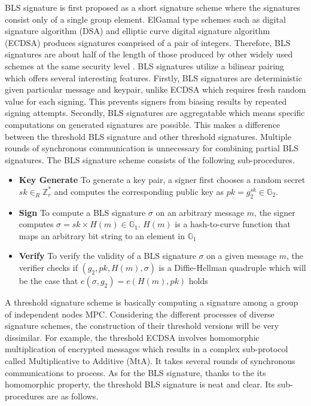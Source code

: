\documentclass[11pt]{article}
\begin{document}
BLS signature is first proposed as a short signature scheme where the signatures consist only of a single group element. ElGamal type schemes such as digital signature algorithm (DSA) and elliptic curve digital signature algorithm (ECDSA) produces signatures comprised of a pair of integers. Therefore, BLS signatures are about half of the length of those produced by other widely used schemes at the same security level \cite{menezes2009introduction}. BLS signatures utilize a bilinear pairing which offers several interesting features. Firstly, BLS signatures are deterministic given particular message and keypair, unlike ECDSA which requires fresh random value for each signing. This prevents signers from biasing results by repeated signing attempts. Secondly, BLS signatures are aggregatable which means specific computations on generated signatures are possible. This makes a difference between the threshold BLS signature and other threshold signatures. Multiple rounds of synchronous communication is unnecessary for combining partial BLS signatures. The BLS signature scheme consists of the following sub-procedures.
\begin{itemize}
    \item[] \textbf{Key Generate} To generate a key pair, a signer first chooses a random secret $sk \in_R \mathbb{Z}_r^*$ and computes the corresponding public key as $pk = g_2^{sk} \in \mathbb{G}_2$.
    \item[] \textbf{Sign} To compute a BLS signature $\sigma$ on an arbitrary message $m$, the signer computes $\sigma = sk \times H(m) \in \mathbb{G}_1$. $H(m)$ is a hash-to-curve function that maps an arbitrary bit string to an element in $\mathbb{G}_1$
    \item[] \textbf{Verify} To verify the validity of a BLS signature $\sigma$ on a given message $m$, the verifier checks if $(g_2,pk,H(m),\sigma)$ is a Diffie-Hellman quadruple which will be the case that $e(\sigma,g_2)=e(H(m),pk)$ holds
\end{itemize}

A threshold signature scheme is basically computing a signature among a group of independent nodes MPC. Considering the different processes of diverse signature schemes, the construction of their threshold versions will be very dissimilar. For example, the threshold ECDSA involves homomorphic multiplication of encrypted messages which results in a complex sub-protocol called Multiplicative to Additive (MtA). It takes several rounds of synchronous communications to process. As for the BLS signature, thanks to the its homomorphic property, the threshold BLS signature is neat and clear. Its sub-procedures are as follows.
\end{document}
